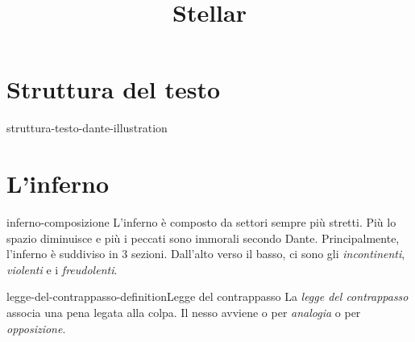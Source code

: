 \documentclass[preview]{standalone}
\begin{document}
\title{Stellar}
\genpage

\section{Struttura del testo}

\begin{snippet}{struttura-testo-dante-illustration}
    \begin{center}
    \end{center}
    \phantom{}
\end{snippet}

\section{L'inferno}

\begin{snippet}{inferno-composizione}
    L'inferno è composto da settori sempre più stretti. Più lo spazio diminuisce e più i peccati sono immorali
    secondo Dante.
    Principalmente, l'inferno è suddiviso in 3 sezioni.
    Dall'alto verso il basso, ci sono gli \textit{incontinenti}, \textit{violenti} e
    i \textit{freudolenti}.
\end{snippet}

\begin{snippetdefinition}{legge-del-contrappasso-definition}{Legge del contrappasso}
    La \textit{legge del contrappasso} associa una pena
    legata alla colpa.
    Il nesso avviene o per \textit{analogia} o per \textit{opposizione}.
\end{snippetdefinition}
\end{document}
